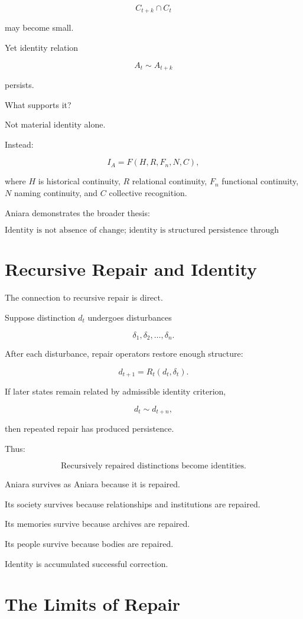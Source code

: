 \documentclass[11pt,oneside]{book}
\theoremstyle{definition}
\theoremstyle{remark}
\begin{document}
\[
C_{t+k}\cap C_t
\]

may become small.

Yet identity relation

\[
A_t\sim A_{t+k}
\]

persists.

What supports it?

Not material identity alone.

Instead:

\[
I_A
=
F(
H,
R,
F_n,
N,
C
),
\]

where \(H\) is historical continuity, \(R\) relational continuity, \(F_n\) functional continuity, \(N\) naming continuity, and \(C\) collective recognition.

Aniara demonstrates the broader thesis:

\[
\boxed{
\text{Identity is not absence of change; identity is structured persistence through change.}
}
\]

\section{Recursive Repair and Identity}

The connection to recursive repair is direct.

Suppose distinction \(d_t\) undergoes disturbances

\[
\delta_1,\delta_2,\ldots,\delta_n.
\]

After each disturbance, repair operators restore enough structure:

\[
d_{t+1}
=
R_t(d_t,\delta_t).
\]

If later states remain related by admissible identity criterion,

\[
d_t\sim d_{t+n},
\]

then repeated repair has produced persistence.

Thus:

\[
\boxed{
\text{Recursively repaired distinctions become identities.}
}
\]

Aniara survives as Aniara because it is repaired.

Its society survives because relationships and institutions are repaired.

Its memories survive because archives are repaired.

Its people survive because bodies are repaired.

Identity is accumulated successful correction.

\section{The Limits of Repair}
\end{document}
